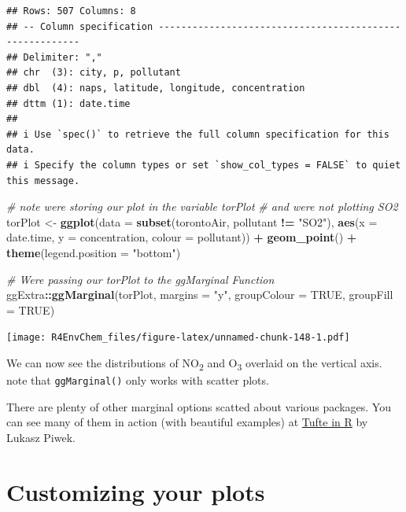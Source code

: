 \documentclass[
]{book}
\newenvironment{Shaded}{\begin{snugshade}}{\end{snugshade}}
\newcommand{\AttributeTok}[1]{\textcolor[rgb]{0.13,0.29,0.53}{#1}}
\newcommand{\CommentTok}[1]{\textcolor[rgb]{0.56,0.35,0.01}{\textit{#1}}}
\newcommand{\ConstantTok}[1]{\textcolor[rgb]{0.56,0.35,0.01}{#1}}
\newcommand{\FunctionTok}[1]{\textcolor[rgb]{0.13,0.29,0.53}{\textbf{#1}}}
\newcommand{\NormalTok}[1]{#1}
\newcommand{\OtherTok}[1]{\textcolor[rgb]{0.56,0.35,0.01}{#1}}
\newcommand{\SpecialCharTok}[1]{\textcolor[rgb]{0.81,0.36,0.00}{\textbf{#1}}}
\newcommand{\StringTok}[1]{\textcolor[rgb]{0.31,0.60,0.02}{#1}}
\begin{document}
\begin{verbatim}
## Rows: 507 Columns: 8
## -- Column specification --------------------------------------------------------
## Delimiter: ","
## chr  (3): city, p, pollutant
## dbl  (4): naps, latitude, longitude, concentration
## dttm (1): date.time
## 
## i Use `spec()` to retrieve the full column specification for this data.
## i Specify the column types or set `show_col_types = FALSE` to quiet this message.
\end{verbatim}

\begin{Shaded}
\begin{Highlighting}[]
\CommentTok{\# note we\textquotesingle{}re storing our plot in the variable \textquotesingle{}torPlot\textquotesingle{}}
\CommentTok{\# and we\textquotesingle{}re not plotting SO2}
\NormalTok{torPlot }\OtherTok{\textless{}{-}} \FunctionTok{ggplot}\NormalTok{(}\AttributeTok{data =} \FunctionTok{subset}\NormalTok{(torontoAir, pollutant }\SpecialCharTok{!=} \StringTok{"SO2"}\NormalTok{), }
       \FunctionTok{aes}\NormalTok{(}\AttributeTok{x =}\NormalTok{ date.time,}
           \AttributeTok{y =}\NormalTok{ concentration,}
           \AttributeTok{colour =}\NormalTok{ pollutant)) }\SpecialCharTok{+}
  \FunctionTok{geom\_point}\NormalTok{() }\SpecialCharTok{+}
  \FunctionTok{theme}\NormalTok{(}\AttributeTok{legend.position =} \StringTok{"bottom"}\NormalTok{)}

\CommentTok{\# We\textquotesingle{}re passing our torPlot to the ggMarginal Function}
\NormalTok{ggExtra}\SpecialCharTok{::}\FunctionTok{ggMarginal}\NormalTok{(torPlot, }\AttributeTok{margins =} \StringTok{"y"}\NormalTok{, }\AttributeTok{groupColour =} \ConstantTok{TRUE}\NormalTok{, }\AttributeTok{groupFill =} \ConstantTok{TRUE}\NormalTok{)}
\end{Highlighting}
\end{Shaded}

\texttt{[image: R4EnvChem\_files/figure-latex/unnamed-chunk-148-1.pdf]}

We can now see the distributions of NO\textsubscript{2} and O\textsubscript{3} overlaid on the vertical axis. note that \texttt{ggMarginal()} only works with scatter plots.

There are plenty of other marginal options scatted about various packages. You can see many of them in action (with beautiful examples) at \href{http://motioninsocial.com/tufte/\#minimal-line-plot}{Tufte in R} by Lukasz Piwek.

\hypertarget{customizing-your-plots}{%
\chapter{Customizing your plots}\label{customizing-your-plots}}
\end{document}
